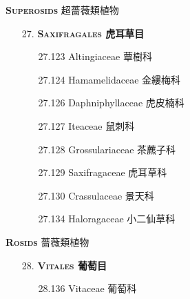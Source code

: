 \footnotesize\selectfont
\vspace{2ex} 
\noindent \normalsize\textsc{\textbf{Superosids} 超薔薇類植物}\selectfont \\
\footnotesize\selectfont
\begin{enumerate}
  \item[27. ] \textbf{\textsc{Saxifragales} 虎耳草目}   
    \begin{enumerate}
      \item[27.123] Altingiaceae 蕈樹科     
        
      \item[27.124] Hamamelidaceae 金縷梅科     
        
      \item[27.126] Daphniphyllaceae 虎皮楠科     
        
      \item[27.127] Iteaceae 鼠刺科     
        
      \item[27.128] Grossulariaceae 茶藨子科     
        
      \item[27.129] Saxifragaceae 虎耳草科     
        
      \item[27.130] Crassulaceae 景天科     
        
      \item[27.134] Haloragaceae 小二仙草科     
        
    \end{enumerate}
\end{enumerate}
\vspace{2ex} 
\noindent \normalsize\textsc{\textbf{Rosids} 薔薇類植物}\selectfont \\
\footnotesize\selectfont
\begin{enumerate}
  \item[28. ] \textbf{\textsc{Vitales} 葡萄目}   
    \begin{enumerate}
      \item[28.136] Vitaceae 葡萄科     
        
    \end{enumerate}
\end{enumerate}
\vspace{2ex} 
